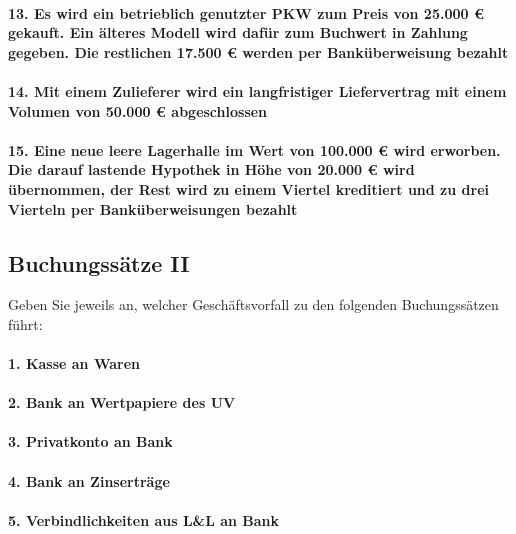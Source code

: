 \documentclass[paper=a4, fontsize=11pt]{scrartcl}
\numberwithin{equation}{section}
\numberwithin{figure}{section}
\numberwithin{table}{section}
\begin{document}
\paragraph{13. Es wird ein betrieblich genutzter PKW zum Preis von 25.000 € gekauft. Ein älteres Modell wird dafür zum Buchwert in Zahlung gegeben. Die restlichen 17.500 € werden per Banküberweisung bezahlt}

\paragraph{14. Mit einem Zulieferer wird ein langfristiger Liefervertrag mit einem Volumen von 50.000 € abgeschlossen}

\paragraph{15. Eine neue leere Lagerhalle im Wert von 100.000 € wird erworben. Die darauf lastende Hypothek in Höhe von 20.000 € wird übernommen, der Rest wird zu einem Viertel kreditiert und zu drei Vierteln per Banküberweisungen bezahlt}


\subsection{Buchungssätze II}

Geben Sie jeweils an, welcher Geschäftsvorfall zu den folgenden Buchungssätzen führt:

\paragraph{1. Kasse an Waren}

\paragraph{2. Bank an Wertpapiere des UV}

\paragraph{3. Privatkonto an Bank}

\paragraph{4. Bank an Zinserträge}

\paragraph{5. Verbindlichkeiten aus L&L an Bank}
\end{document}
